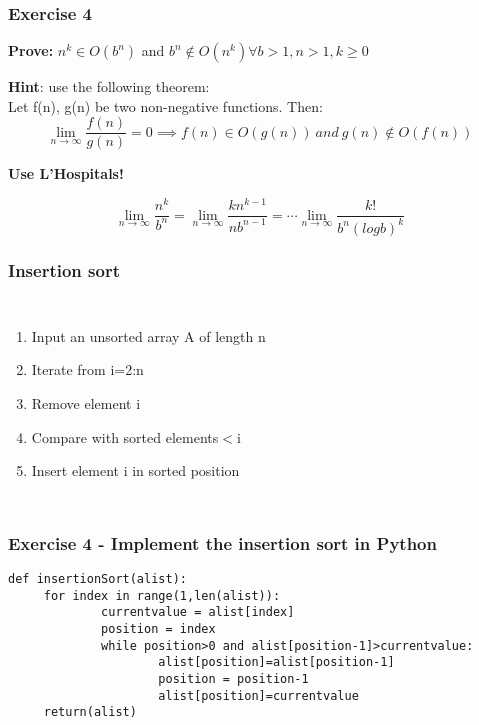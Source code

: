 \documentclass{beamer}
\begin{document}
\begin{frame}[noframenumbering]
\frametitle{Exercise 4}
\textbf{Prove:} $n^{k} \in O(b^{n})$ and $b^{n} 	\notin O(n^{k}) \forall b> 1, n>1, k\geq 0$ \\
 
 \begin{center}
{\color{blue} \textbf{Hint}: use the following theorem: \\

Let f(n), g(n) be two non-negative functions. Then: $$\lim_{n \to \infty} \frac{f(n)}{g(n)} = 0 \implies f (n) \in O(g(n)) \ and \ g(n) 	\notin O(f(n))$$ }
\end{center}
\textbf{Use L'Hospitals! }

$$\lim_{n \to \infty}  \frac{n^{k}}{b^{n}}= \lim_{n \to \infty}  \frac{kn^{k-1}}{nb^{n-1}}
= \cdots \lim_{n \to \infty} \frac{k!} {b^{n}(log b)^{k}}$$

\end{frame}

 

\begin{frame}
\frametitle{Insertion sort}

\begin{columns}[c]  
 
\begin{enumerate}
\item Input an unsorted array A of length n
\item Iterate from i=2:n
\item Remove element i
\item Compare with sorted elements$<$i
\item Insert element i in sorted position
\end{enumerate}

\end{columns}
 

\end{frame}



\begin{frame}[fragile]
\frametitle{Exercise 4 - Implement the insertion sort in Python}


 {\small 
\begin{verbatim}
def insertionSort(alist):
     for index in range(1,len(alist)):
             currentvalue = alist[index]  
             position = index
             while position>0 and alist[position-1]>currentvalue:
                     alist[position]=alist[position-1] 
                     position = position-1 
                     alist[position]=currentvalue 
     return(alist)
\end{verbatim}}
\end{frame}
\end{document}
